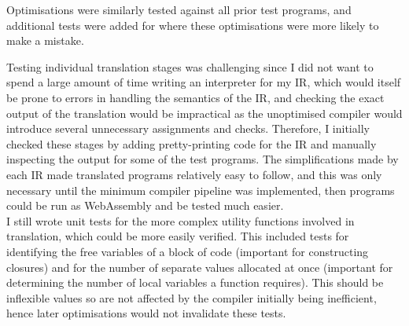 Optimisations were similarly tested against all prior test programs, and additional tests were added for where these optimisations were more likely to make a mistake. %

Testing individual translation stages was challenging since I did not want to spend a large amount of time writing an interpreter for my IR, which would itself be prone to errors in handling the semantics of the IR, and checking the exact output of the translation would be impractical as the unoptimised compiler would introduce several unnecessary assignments and checks. Therefore, I initially checked these stages by adding pretty-printing code for the IR and manually inspecting the output for some of the test programs. The simplifications made by each IR made translated programs relatively easy to follow, and this was only necessary until the minimum compiler pipeline was implemented, then programs could be run as WebAssembly and be tested much easier. \\
I still wrote unit tests for the more complex utility functions involved in translation, which could be more easily verified. This included tests for identifying the free variables of a block of code (important for constructing closures) and for the number of separate values allocated at once (important for determining the number of local variables a function requires). This should be inflexible values so are not affected by the compiler initially being inefficient, hence later optimisations would not invalidate these tests.
